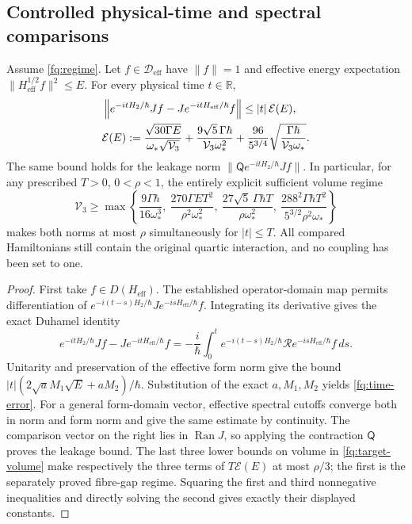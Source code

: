 \subsection{Controlled physical-time and spectral comparisons}

\begin{theorem}
\label{fq:dynamics}
Assume \eqref{fq:regime}. Let $f\in\mathcal D_{\mathrm{eff}}$
have $\|f\|=1$ and effective energy expectation
$\|H_{\mathrm{eff}}^{1/2}f\|^2\leq E$. For every physical time
$t\in\mathbb R$,
\begin{align}
 &\left\|e^{-itH_2/\hbar}Jf
                      -Je^{-itH_{\mathrm{eff}}/\hbar}f\right\|
       \leq |t|\,\mathcal E(E),\label{fq:time-error}\\
 &\mathcal E(E):=
 \frac{\sqrt{30\Gamma E}}{\omega_*\sqrt{\mathcal V_3}}
 +\frac{9\sqrt5\,\Gamma\hbar}{\mathcal V_3\omega_*^2}
 +\frac{96}{5^{3/4}}
             \sqrt{\frac{\Gamma\hbar}{\mathcal V_3\omega_*}}.
       \notag
\end{align}
The same bound holds for the leakage norm
$\|\mathsf Qe^{-itH_2/\hbar}Jf\|$.
In particular, for any prescribed $T>0$, $0<\rho<1$, the entirely
explicit sufficient volume regime
\begin{equation}\label{fq:target-volume}
 \mathcal V_3\geq\max\left\{
 \frac{9\Gamma\hbar}{16\omega_*^3},\
 \frac{270\Gamma E T^2}{\rho^2\omega_*^2},\
 \frac{27\sqrt5\,\Gamma\hbar T}{\rho\omega_*^2},\
 \frac{288^2\Gamma\hbar T^2}{5^{3/2}\rho^2\omega_*}
 \right\}
\end{equation}
makes both norms at most $\rho$ simultaneously for $|t|\leq T$.
All compared Hamiltonians still contain the original quartic
interaction, and no coupling has been set to one.
\end{theorem}
\begin{proof}
First take $f\in D(H_{\mathrm{eff}})$. The established operator-domain
map permits differentiation of
$e^{-i(t-s)H_2/\hbar}Je^{-isH_{\mathrm{eff}}/\hbar}f$.
Integrating its derivative gives the exact Duhamel identity
\[
 e^{-itH_2/\hbar}Jf-Je^{-itH_{\mathrm{eff}}/\hbar}f
 =-\frac{i}{\hbar}\int_0^t
    e^{-i(t-s)H_2/\hbar}\mathcal R
                       e^{-isH_{\mathrm{eff}}/\hbar}f\,ds.
\]
Unitarity and preservation of the effective form norm give the bound
$|t|(2\sqrt aM_1\sqrt E+aM_2)/\hbar$. Substitution of the exact
$a,M_1,M_2$ yields \eqref{fq:time-error}. For a general form-domain
vector, effective spectral cutoffs converge both in norm and form
norm and give the same estimate by continuity. The comparison
vector on the right lies in $\operatorname{Ran}J$, so applying
the contraction $\mathsf Q$ proves the leakage bound.
The last three lower bounds on volume in \eqref{fq:target-volume}
make respectively the three terms of $T\mathcal E(E)$ at most
$\rho/3$; the first is the separately proved fibre-gap regime.
Squaring the first and third nonnegative inequalities and directly
solving the second gives exactly their displayed constants.
\end{proof}


